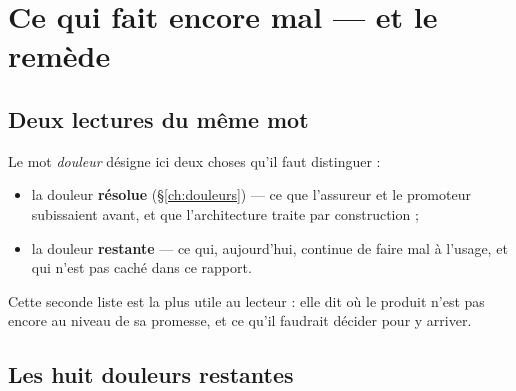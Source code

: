 \chapter{Ce qui fait encore mal — et le remède}
\label{ch:douleurs-restantes}

\section{Deux lectures du même mot}

Le mot \emph{douleur} désigne ici deux choses qu'il faut distinguer :

\begin{itemize}
  \item la douleur \textbf{résolue} (\S\ref{ch:douleurs}) — ce que l'assureur et
    le promoteur subissaient avant, et que l'architecture traite par
    construction ;
  \item la douleur \textbf{restante} — ce qui, aujourd'hui, continue de faire mal
    à l'usage, et qui n'est pas caché dans ce rapport.
\end{itemize}

Cette seconde liste est la plus utile au lecteur : elle dit où le produit
n'est pas encore au niveau de sa promesse, et ce qu'il faudrait décider pour y
arriver.

\section{Les huit douleurs restantes}

